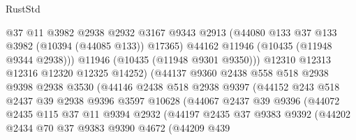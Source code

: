 \begin{lexlean}{RustStd}
\begin{coremodule}
                              @37
                              @11
                              @3982
                              @2938
                              @2932
                              @3167
                              @9343
                              @2913
                              (@44080 @133 @37 @133 @3982 (@10394 (@44085 @133)) @17365)
                              @44162
                              @11946
                              (@10435 (@11948 @9344 @2938)))
                            @11946
                            (@10435 (@11948 @9301 @9350)))
                          @12310
                          @12313
                          @12316
                          @12320
                          @12325
                          @14252)
                        (@44137
                          @9360
                          @2438
                          @558
                          @518
                          @2938
                          @9398
                          @2938
                          @3530
                          (@44146
                            @2438
                            @518
                            @2938
                            @9397
                            (@44152
                              @243
                              @518
                              @2437
                              @39
                              @2938
                              @9396
                              @3597
                              @10628
                              (@44067
                                @2437
                                @39
                                @9396
                                (@44072
                                  @2435
                                  @115
                                  @37
                                  @11
                                  @9394
                                  @2932
                                  (@44197
                                    @2435
                                    @37
                                    @9383
                                    @9392
                                    (@44202
                                      @2434
                                      @70
                                      @37
                                      @9383
                                      @9390
                                      @4672
                                      (@44209
                                        @439

\end{coremodule}
\end{lexlean}
